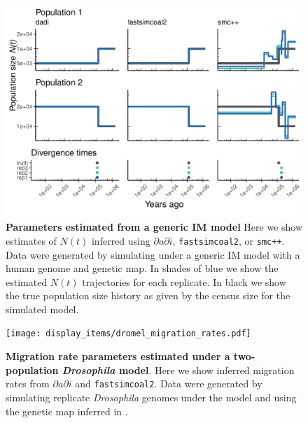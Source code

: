 \documentclass[12pt,halfline,a4paper]{ouparticle}
\newcommand{\dadi}{$\partial a \partial i$\xspace}
\newcommand{\smcpp}{\texttt{smc++}\xspace}
\newcommand{\fastsimcoal}{\texttt{fastsimcoal2}\xspace}
\begin{document}
\begin{figure}
\begin{center}
\includegraphics[width=0.8\linewidth]{display_items/generic_IM.pdf}
\caption{\textbf{Parameters estimated from a generic IM model} Here we show estimates of $N(t)$
inferred using \dadi, \texttt{fastsimcoal2}, or \smcpp. Data were generated by simulating
under a generic IM model with a human genome and \cite{international2007second} genetic map.
In shades of blue we show the estimated
$N(t)$ trajectories for each replicate. In black we show the true population size history
as given by the census size for the simulated model.}
\label{fig:generic_IM}
\end{center}
\end{figure}


\begin{figure}
\begin{center}
\texttt{[image: display\_items/dromel\_migration\_rates.pdf]}
\caption{\textbf{Migration rate parameters estimated under a two-population \emph{Drosophila} model}.
Here we show inferred migration rates from \dadi and \fastsimcoal.
Data were generated by simulating replicate \emph{Drosophila} genomes under the \cite{li2006inferring} model and using the genetic map
inferred in \cite{comeron2012many}.}
\label{fig:dromel_mig_rates}
\end{center}
\end{figure}
\end{document}
